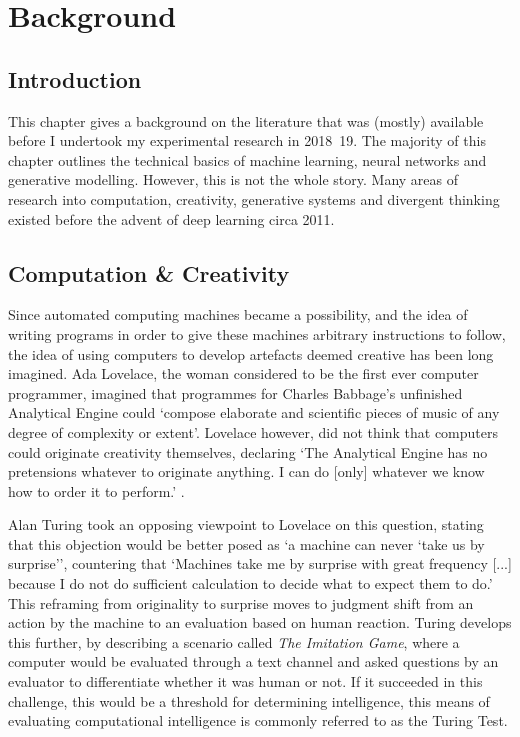 \chapter{Background}
\label{ch:background}

\section{Introduction}

This chapter gives a background on the literature that was (mostly) available before I undertook my experimental research in 2018~19. 
The majority of this chapter outlines the technical basics of machine learning, neural networks and generative modelling. 
However, this is not the whole story. Many areas of research into computation, creativity, generative systems and divergent thinking existed before the advent of deep learning circa 2011. 

\section{Computation \& Creativity}

Since automated computing machines became a possibility, and the idea of writing programs in order to give these machines arbitrary instructions to follow, the idea of using computers to develop artefacts deemed creative has been long imagined. 
Ada Lovelace, the woman considered to be the first ever computer programmer, imagined that programmes for Charles Babbage's unfinished Analytical Engine could ‘compose elaborate and scientific pieces of music of any degree of complexity or extent’.
Lovelace however, did not think that computers could originate creativity themselves, declaring ‘The Analytical Engine has no pretensions whatever to originate anything. I can do [only] whatever we know how to order it to perform.' \citep{lovelace1843notes}.

Alan Turing took an opposing viewpoint to Lovelace on this question, stating that this objection would be better posed as ‘a machine can never ‘take us by surprise’’, countering that ‘Machines take me by surprise with great frequency [...] because I do not do sufficient calculation to decide what to expect them to do.’  \citep{machinery1950computing}
This reframing from originality to surprise moves to judgment shift from an action by the machine to an evaluation based on human reaction. 
Turing develops this further, by describing a scenario called \textit{The Imitation Game}, where a computer would be evaluated through a text channel and asked questions by an evaluator to differentiate whether it was human or not. 
If it succeeded in this challenge, this would be a threshold for determining intelligence,
this means of evaluating computational intelligence is commonly referred to as the Turing Test. 

